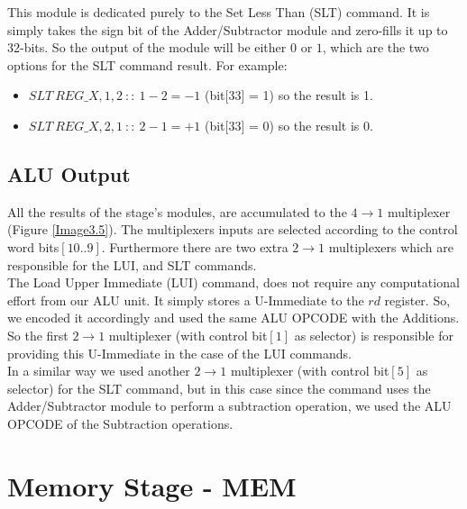   	This module is dedicated purely to the Set Less Than (SLT) command. It is simply takes the sign bit of the Adder/Subtractor module and zero-fills it up to 32-bits. So the output of the module will be either $0$ or $1$, which are the two options for the SLT command result. For example: 
  	\begin{footnotesize}
  		\begin{itemize}
  			\item $SLT\  REG\_X, 1,2\  ::\  1 - 2 = -1$ (bit[33] = 1) so the result is 1.
  			\item $SLT\  REG\_X, 2,1\  ::\  2 - 1 = +1$ (bit[33] = 0) so the result is 0.
  		\end{itemize}
  	\end{footnotesize}
  	
  	\clearpage
  	
  	
  \subsection{ALU Output}
  \label{SubSec3.3.6:ALUOUT}
  
  All the results of the stage's modules, are accumulated to the $4\rightarrow1$ multiplexer (Figure \ref{Image3.5}). The multiplexers inputs are selected according to the control word bits$[10..9]$. Furthermore there are two extra $2\rightarrow1$ multiplexers which are responsible for the LUI, and SLT commands. \\
  
  The Load Upper Immediate (LUI) command, does not require any computational effort from our ALU unit. It simply stores a U-Immediate to the $rd$ register. So, we encoded it accordingly and used the same ALU OPCODE with the Additions. So the first $2\rightarrow1$ multiplexer (with control bit$[1]$ as selector) is responsible for providing this U-Immediate in the case of the LUI commands.\\
  
  In a similar way we used another $2\rightarrow1$ multiplexer (with control bit$[5]$ as selector) for the SLT command, but in this case since the command uses the Adder/Subtractor module to perform a subtraction operation, we used the ALU OPCODE of the Subtraction operations. 
  \clearpage
  
\section{Memory Stage - MEM}
  \label{Sec3.4:MEM}
  
